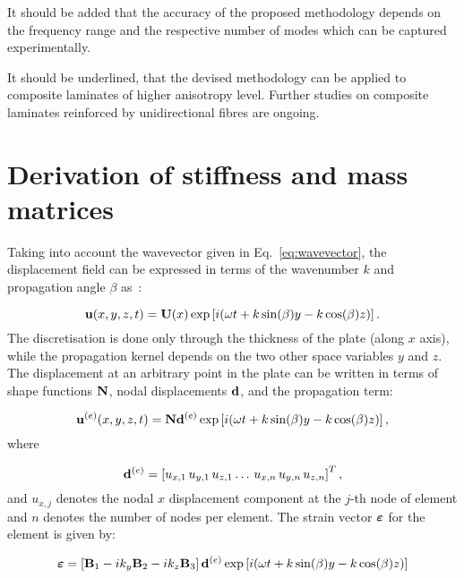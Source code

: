 It should be added that the accuracy of the proposed methodology depends on the frequency range and the respective number of modes which can be captured experimentally.
	
It should be underlined, that the devised methodology can be applied to composite laminates of higher anisotropy level. Further studies on composite laminates reinforced by unidirectional fibres are ongoing.

\appendix
	 
\section{Derivation of stiffness and mass matrices}
	 Taking into account the wavevector given in Eq.~\ref{eq:wavevector}, the 
	 displacement field can be expressed in terms of the wavenumber \(k\) and 
	 propagation angle \(\beta\) as~\cite{Taupin2011}:
	  
\begin{equation}
	 \mathbf{u}(x,y,z,t) = \mathbf{U}(x) \exp \left[ i (\omega t + k \sin (\beta) y - k \cos (\beta) z)\right].
	 \end{equation}
	 The discretisation is done only through the thickness of the plate (along \(x\) axis), 
	 while the propagation kernel depends on the two other space variables \(y\) and \(z\). 
	 The displacement at an arbitrary point in the plate can be written in terms of shape 
	 functions \( \mathbf{N}\), nodal displacements \( \mathbf{d}\), and the propagation term:
	 
\begin{equation}
	 \mathbf{u}^{(e)}(x,y,z,t) = \mathbf{N} \mathbf{d}^{(e)} \exp \left[ i (\omega t + k \sin (\beta) y - k \cos (\beta) z)\right],
	 \end{equation}
	 where
	 
\begin{equation}
	 \mathbf{d}^{(e)} =  \left[ u_{x,1} \, u_{y,1} \, u_{z,1} \ldots  \, u_{x,n} \, u_{y,n} \, u_{z,n} \right]^T,
	 \end{equation}
	 and \(u_{x,j}\) denotes the nodal \(x\) displacement component at the \(j\)-th node of 
	 element and \(n\) denotes the number of nodes per element.
	 The strain vector \(\boldsymbol{\varepsilon}\) for the element is given by:
	  
\begin{equation}
	 \boldsymbol{\varepsilon}= \left[ \mathbf{B}_1 -i k_y \mathbf{B}_2 -i k_z \mathbf{B}_3 \right] \mathbf{d}^{(e)} \exp \left[ i (\omega t + k \sin (\beta) y - k \cos (\beta) z)\right]
	 \end{equation}
	  
